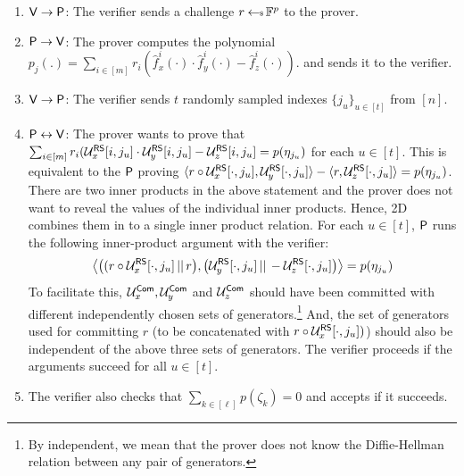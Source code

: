 \begin{enumerate}[{\rm 1.}]
\item $\mathsf{V}\rightarrow\mathsf{P}$: The verifier sends a challenge $r\hskip2.3pt{\gets\!\!\mbox{\tiny${\$}$\normalsize}}\,
\mathbb{F}^p$ to the prover.
\item $\mathsf{P}\rightarrow\mathsf{V}$: The prover computes the polynomial $p_j(.)=\sum_{i\in [m]}
r_i(\hat{f}^i_x(\cdot) \cdot \hat{f}^i_y(\cdot) - \hat{f}^i_z(\cdot))$.
and sends it to the verifier.

\item $\mathsf{V}\rightarrow\mathsf{P}$: The verifier sends $t$ randomly sampled indexes $\{j_u\}_{u\in [t]}$ from $[n]$. 

\item $\mathsf{P}\leftrightarrow\mathsf{V}$: The prover wants to prove that 
$\sum_{i\in [m]} r_i(\mathcal{U}^{\mathsf{RS}}_x[i,j_u] \cdot \mathcal{U}^{\mathsf{RS}}_y[i,j_u]-\mathcal{U}^{\mathsf{RS}}_z[i,j_u] = p(\eta_{j_u})$ for each $u \in [t]$.
This is equivalent to the $\mathsf{P}$ proving $\langle r \circ \mathcal{U}^{\mathsf{RS}}_x[\cdot,j_u],\mathcal{U}^{\mathsf{RS}}_y[\cdot,j_u]\rangle - \langle r,\mathcal{U}^{\mathsf{RS}}_z[\cdot,j_u]\rangle = p(\eta_{j_u})$. There are two inner products in the above statement and the prover does not want to reveal the values of the individual inner products. Hence, \name2D{} combines them in to a single inner product relation.
For each $u \in [t]$, $\mathsf{P}$ runs the following inner-product argument with the verifier: 
\[
\left\langle{\left( (r \circ \mathcal{U}^{\mathsf{RS}}_x[\cdot,j_u] \, || \, r \right)} , {\left( \mathcal{U}^{\mathsf{RS}}_y[\cdot,j_u] \, || \, -\mathcal{U}^{\mathsf{RS}}_z[\cdot,j_u] \right)} \right\rangle = p(\eta_{j_u})
\]
To facilitate this, $\mathcal{U}^{\mathsf{Com}}_x,\mathcal{U}^{\mathsf{Com}}_y$ and $\mathcal{U}^{\mathsf{Com}}_z$ should have been committed with different independently chosen sets of generators.\footnote{By independent, we mean that the prover does not know the Diffie-Hellman relation between any pair of generators.} And, the set of generators used for committing $r$ (to be concatenated with $r \circ \mathcal{U}^{\mathsf{RS}}_x[\cdot,j_u])$) should also be independent of the above three sets of generators.
The verifier proceeds if the arguments succeed for all $u \in [t]$.

\item The verifier also checks that $\sum_{k\in [\ell]}p(\zeta_k)=0$ and accepts if it succeeds.
\end{enumerate}






